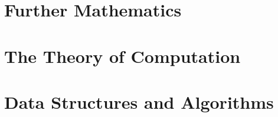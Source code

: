 \documentclass[11pt,twoside=semi,openright,numbers=noenddot,titlepage=false]{scrbook}
\begin{document}
\part{Further Mathematics}\label{part:maths}
\parttoc{}
% 
% 
%  
%  
%  
%  
%  
%  
%  
% 
% 
%  
%  
%  
%  
%  
% 
% 
% 


\part{The Theory of Computation}\label{part:theoretical}
\parttoc{}

% 
% 
% 
% 
% 
% 
% 
% 
% 
% 
% 
% 
% 
% 


\part{Data Structures and Algorithms}\label{part:dsa}
\parttoc{}
% 
% 
% 
% 
% 
% 
% 
% 
\end{document}

